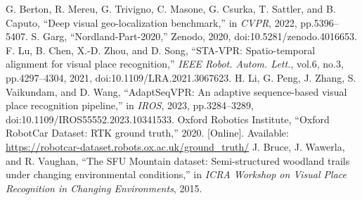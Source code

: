  G. Berton, R. Mereu, G. Trivigno, C. Masone, G. Csurka, T. Sattler, and B. Caputo, ``Deep visual geo-localization benchmark,'' in \emph{CVPR}, 2022, pp.5396--5407.
 S. Garg, ``Nordland-Part-2020,'' Zenodo, 2020, doi:10.5281/zenodo.4016653.
 F. Lu, B. Chen, X.-D. Zhou, and D. Song, ``STA-VPR: Spatio-temporal alignment for visual place recognition,'' \emph{IEEE Robot. Autom. Lett.}, vol.6, no.3, pp.4297--4304, 2021, doi:10.1109/LRA.2021.3067623.
 H. Li, G. Peng, J. Zhang, S. Vaikundam, and D. Wang, ``AdaptSeqVPR: An adaptive sequence-based visual place recognition pipeline,'' in \emph{IROS}, 2023, pp.3284--3289, doi:10.1109/IROS55552.2023.10341533.
 Oxford Robotics Institute, ``Oxford RobotCar Dataset: RTK ground truth,'' 2020. [Online]. Available: \url{https://robotcar-dataset.robots.ox.ac.uk/ground_truth/}
 J. Bruce, J. Wawerla, and R. Vaughan, ``The SFU Mountain dataset: Semi-structured woodland trails under changing environmental conditions,'' in \emph{ICRA Workshop on Visual Place Recognition in Changing Environments}, 2015.

